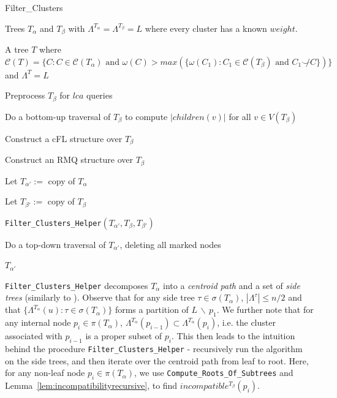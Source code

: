 \documentclass{article}
\newcommand{\compatible}{\smile}
\newcommand{\leafset}{\Lambda}
\newcommand{\weight}{\omega}
\newcommand{\TA}{T_\alpha}
\newcommand{\TB}{T_\beta}
\begin{document}
    \begin{algorithm}
        \caption{Filter\_Clusters}
        \label{alg:filterclusters}

        \begin{algorithmic}[1]
            \Input Trees $\TA$ and $\TB$ with $\leafset^{\TA} = \leafset^{\TB} = L$ where every cluster has a known $weight$.

            \Output A tree $T$ where $\mathcal{C}(T) = \{C : C \in \mathcal{C}(\TA) \text{ and } \weight(C) > max(\{\weight(C_1) : C_1 \in \mathcal{C}(\TB) \text{ and } C_1 \not\compatible C\})\}$ and $\leafset^T = L$

            \State Preprocess $\TB$ for $lca$ queries

            \State Do a bottom-up traversal of $\TB$ to compute $|children(v)|$ for all $v \in V(\TB)$

            \State Construct a cFL structure over $\TB$

            \State Construct an RMQ structure over $\TB$

            \State Let $T_{\alpha'} :=$ copy of $\TA$

            \State Let $T_{\beta'} :=$ copy of $\TB$

            \State \texttt{Filter\_Clusters\_Helper}$(T_{\alpha'}, \TB, T_{\beta'})$

            \State Do a top-down traversal of $T_{\alpha'}$, deleting all marked nodes

            \State \Return $T_{\alpha'}$
        \end{algorithmic}
    \end{algorithm}

    \texttt{Filter\_Clusters\_Helper} decomposes $\TA$ into a \textit{centroid path} and a set of \textit{side trees} (similarly to \cite{jansson2018algorithms}). Observe that for any side tree $\tau \in \sigma(\TA)$, $|\leafset^\tau| \leq n/2$ and that $\{\leafset^{\TA}(u) : \tau \in \sigma(\TA)\}$ forms a partition of $L\, \backslash\, {p_1}$. We further note that for any internal node $p_i \in \pi(\TA)$, $\leafset^{\TA}(p_{i - 1}) \subset \leafset^{\TA}(p_i)$, i.e. the cluster associated with $p_{i-1}$ is a proper subset of $p_i$. This then leads to the intuition behind the procedure \texttt{Filter\_Clusters\_Helper} - recursively run the algorithm on the side trees, and then iterate over the centroid path from leaf to root. Here, for any non-leaf node $p_i \in \pi(\TA)$, we use \texttt{Compute\_Roots\_Of\_Subtrees} and Lemma~\ref{lem:incompatibilityrecursive}, to find $incompatible^{\TB}(p_i)$.
\end{document}
